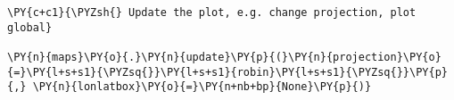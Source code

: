 \begin{Verbatim}[commandchars=\\\{\}]
\PY{c+c1}{\PYZsh{} Update the plot, e.g. change projection, plot global}

\PY{n}{maps}\PY{o}{.}\PY{n}{update}\PY{p}{(}\PY{n}{projection}\PY{o}{=}\PY{l+s+s1}{\PYZsq{}}\PY{l+s+s1}{robin}\PY{l+s+s1}{\PYZsq{}}\PY{p}{,} \PY{n}{lonlatbox}\PY{o}{=}\PY{n+nb+bp}{None}\PY{p}{)}
\end{Verbatim}
